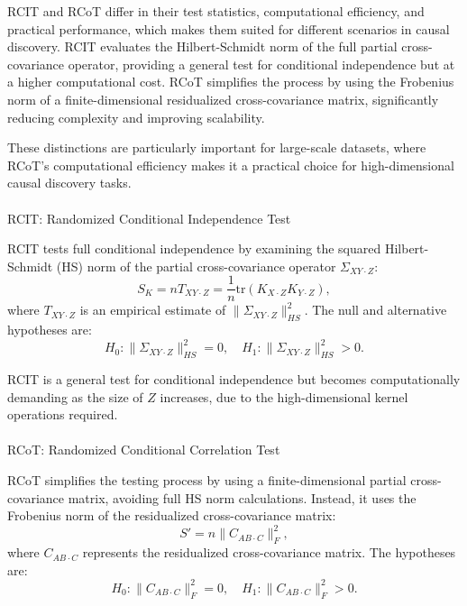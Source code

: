 \documentclass[
]{article}
\makeatletter
\let\oldparagraph\paragraph
\renewcommand{\paragraph}{
    \@ifstar
      \xxxParagraphStar
      \xxxParagraphNoStar
  }
\newcommand{\xxxParagraphStar}[1]{\oldparagraph*{#1}\mbox{}}
\newcommand{\xxxParagraphNoStar}[1]{\oldparagraph{#1}\mbox{}}
\makeatother
\begin{document}
RCIT and RCoT differ in their test statistics, computational efficiency,
and practical performance, which makes them suited for different
scenarios in causal discovery. RCIT evaluates the Hilbert-Schmidt norm
of the full partial cross-covariance operator, providing a general test
for conditional independence but at a higher computational cost. RCoT
simplifies the process by using the Frobenius norm of a
finite-dimensional residualized cross-covariance matrix, significantly
reducing complexity and improving scalability.

These distinctions are particularly important for large-scale datasets,
where RCoT's computational efficiency makes it a practical choice for
high-dimensional causal discovery tasks.

\paragraph{RCIT: Randomized Conditional Independence
Test}\label{rcit-randomized-conditional-independence-test}

RCIT tests full conditional independence by examining the squared
Hilbert-Schmidt (HS) norm of the partial cross-covariance operator
\(\Sigma_{XY \cdot Z}\): \[
S_K = n T_{XY \cdot Z} = \frac{1}{n} \text{tr}(K_{X \cdot Z} K_{Y \cdot Z}),
\] where \(T_{XY \cdot Z}\) is an empirical estimate of
\(\|\Sigma_{XY \cdot Z}\|^2_{HS}\). The null and alternative hypotheses
are: \[
H_0: \|\Sigma_{XY \cdot Z}\|^2_{HS} = 0, \quad H_1: \|\Sigma_{XY \cdot Z}\|^2_{HS} > 0.
\]

RCIT is a general test for conditional independence but becomes
computationally demanding as the size of \(Z\) increases, due to the
high-dimensional kernel operations required.

\paragraph{RCoT: Randomized Conditional Correlation
Test}\label{rcot-randomized-conditional-correlation-test}

RCoT simplifies the testing process by using a finite-dimensional
partial cross-covariance matrix, avoiding full HS norm calculations.
Instead, it uses the Frobenius norm of the residualized cross-covariance
matrix: \[
S' = n \|C_{AB \cdot C}\|_F^2,
\] where \(C_{AB \cdot C}\) represents the residualized cross-covariance
matrix. The hypotheses are: \[
H_0: \|C_{AB \cdot C}\|_F^2 = 0, \quad H_1: \|C_{AB \cdot C}\|_F^2 > 0.
\]
\end{document}
